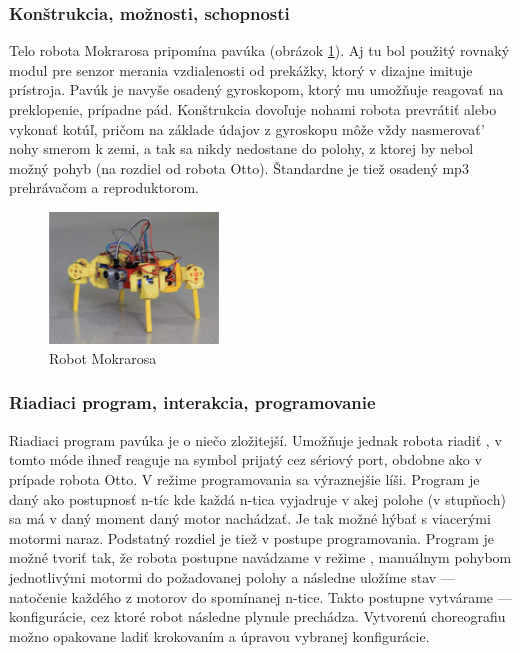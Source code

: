 \subsubsection{Konštrukcia, možnosti, schopnosti}
Telo robota Mokrarosa pripomína pavúka (obrázok \ref{obr:mokrarosa}). Aj tu bol použitý rovnaký modul pre senzor merania vzdialenosti od prekážky, ktorý v dizajne imituje  prístroja. Pavúk je navyše osadený gyroskopom, ktorý mu umožňuje reagovať na preklopenie, prípadne pád. Konštrukcia dovoľuje nohami robota prevrátiť alebo vykonať kotúľ, pričom na základe údajov z gyroskopu môže vždy nasmerovať' nohy smerom k zemi, a tak sa nikdy nedostane do polohy, z ktorej by nebol možný pohyb (na rozdiel od robota Otto). Štandardne je tiež osadený mp3 prehrávačom a reproduktorom.


\begin{figure}
\centerline{\includegraphics[width=0.4\textwidth]{images/mokrarosa}}
\caption[Robot Mokrarosa]{Robot Mokrarosa}
\label{obr:mokrarosa}
\end{figure}

\subsubsection{Riadiaci program, interakcia, programovanie}
Riadiaci program pavúka je o niečo zložitejší. Umožňuje jednak robota riadiť , v tomto móde ihneď reaguje na symbol prijatý cez sériový port, obdobne ako v prípade robota Otto. V režime programovania sa výraznejšie líši. Program je daný ako postupnosť n-tíc kde každá n-tica vyjadruje v akej polohe (v stupňoch) sa má v daný moment daný motor nachádzať. Je tak možné hýbať s viacerými motormi naraz. Podstatný rozdiel je tiež v postupe programovania. Program je možné tvoriť tak, že robota postupne navádzame v režime , manuálnym pohybom jednotlivými motormi do požadovanej polohy a následne uložíme stav --- natočenie každého z motorov do spomínanej n-tice. Takto postupne vytvárame  --- konfigurácie, cez ktoré robot následne plynule prechádza. Vytvorenú choreografiu možno opakovane ladiť krokovaním a úpravou vybranej konfigurácie.


